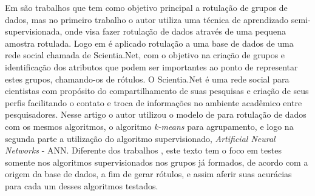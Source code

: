 Em \cite{Metodo2015,DeLima2015} são trabalhos que tem como objetivo principal a rotulação de grupos de dados, mas no primeiro trabalho o autor utiliza uma técnica de aprendizado semi-supervisionada, onde visa fazer rotulação de dados através de uma pequena amostra rotulada. Logo em \cite{DeLima2015} é aplicado rotulação a uma base de dados de uma rede social chamada de Scientia.Net, com o objetivo na criação de grupos e identificação dos atributos que podem ser importantes ao ponto de representar estes  grupos, chamando-os de rótulos. O Scientia.Net é uma rede social para cientistas com propósito do compartilhamento de suas pesquisas e criação de seus perfis facilitando o contato e troca de informações no ambiente acadêmico entre pesquisadores. Nesse artigo o autor utilizou o modelo de \cite{Lopes2016} para rotulação de dados com os mesmos algoritmos, o algoritmo \textit{k-means} para agrupamento, e logo na segunda parte a utilização  do algoritmo supervisionado, \textit{Artificial Neural Networks} - ANN. Diferente dos trabalhos \cite{Metodo2015,DeLima2015}, este texto tem o foco em testes somente nos algoritmos supervisionados nos grupos já formados, de acordo com a origem da base de dados, a fim de gerar rótulos, e assim aferir suas acurácias para cada um desses algoritmos testados.
% 
% 
% 
% 

